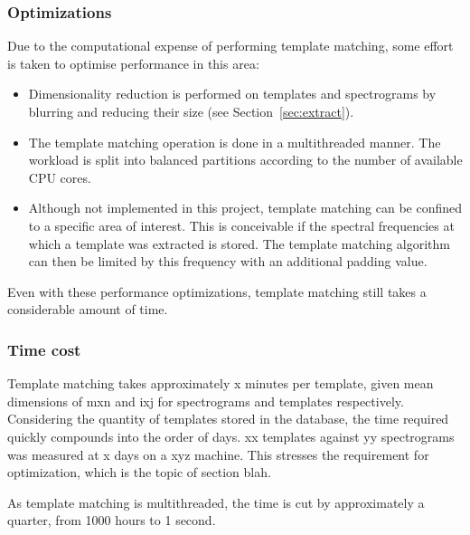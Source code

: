 \subsubsection{Optimizations}
Due to the computational expense of performing template matching, some effort is
taken to optimise performance in this area:

\begin{itemize}
  \item Dimensionality reduction is performed on templates and spectrograms by
blurring and reducing their size (see Section~\ref{sec:extract}).

  \item The template matching operation is done in a multithreaded manner.
The workload is split into balanced partitions according to the number of
available CPU cores.

  \item Although not implemented in this project, template matching can be
confined to a specific area of interest.
This is conceivable if the spectral frequencies at which a template was extracted
is stored.
The template matching algorithm can then be limited by this frequency with an
additional padding value.
\end{itemize}

Even with these performance optimizations, template matching still takes a
considerable amount of time.

\subsubsection{Time cost}
Template matching takes approximately x minutes per template, given
mean dimensions of mxn and ixj for spectrograms and templates respectively.
Considering the quantity of templates stored in the database, the time
required quickly compounds into the order of days.
xx templates against yy spectrograms was measured at x days on a xyz machine.
This stresses the requirement for optimization, which is the topic of
section blah.

As template matching is multithreaded, the time is cut by approximately a
quarter, from 1000 hours to 1 second.
